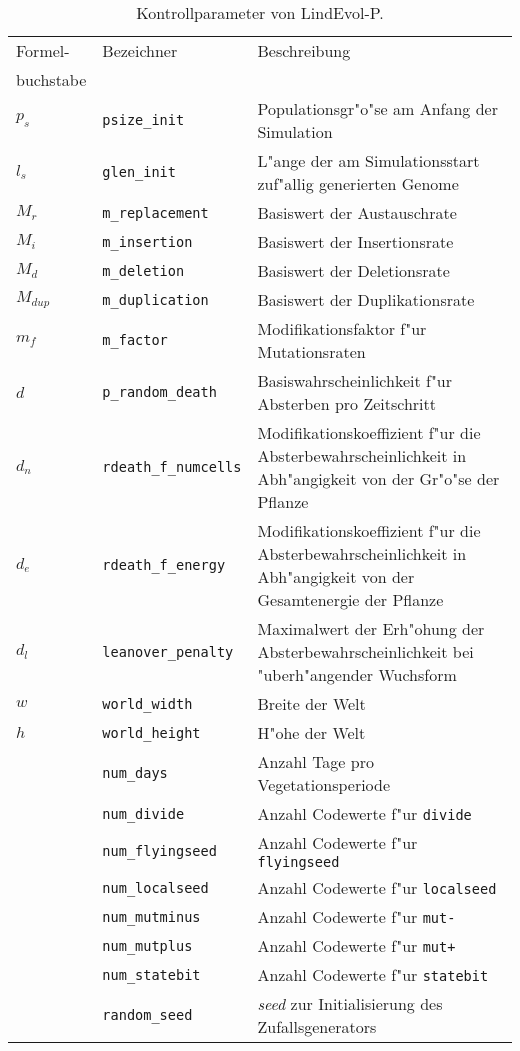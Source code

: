 \begin{table}[tb]

\noindent\begin{tabularx}{\linewidth}{|l|l|X|} \hline
Formel- & Bezeichner              & Beschreibung \\
buchstabe &                       & \\ \hline
$p_s$ & \verb|psize_init|         & Populationsgr"o"se am Anfang der Simulation \\
$l_s$ & \verb|glen_init|          & L"ange der am Simulationsstart zuf"allig generierten Genome \\
$M_r$ & \verb|m_replacement|      & Basiswert der Austauschrate \\
$M_i$ & \verb|m_insertion|        & Basiswert der Insertionsrate \\
$M_d$ & \verb|m_deletion|         & Basiswert der Deletionsrate \\
$M_{\mathit{dup}}$ & \verb|m_duplication| & Basiswert der Duplikationsrate \\
$m_f$ & \verb|m_factor|           & Modifikationsfaktor f"ur Mutationsraten \\
$d$   & \verb|p_random_death|     & Basiswahrscheinlichkeit f"ur Absterben pro Zeitschritt \\
$d_n$ & \verb|rdeath_f_numcells|  & Modifikationskoeffizient f"ur die Absterbewahrscheinlichkeit
                                    in Abh"angigkeit von der Gr"o"se der Pflanze \\
$d_e$ & \verb|rdeath_f_energy|    & Modifikationskoeffizient f"ur die Absterbewahrscheinlichkeit
                                    in Abh"angigkeit von der Gesamtenergie der Pflanze \\
$d_l$ & \verb|leanover_penalty|   & Maximalwert der Erh"ohung der Absterbewahrscheinlichkeit
                                    bei "uberh"angender Wuchsform \\
$w$   & \verb|world_width|        & Breite der Welt \\
$h$   & \verb|world_height|       & H"ohe der Welt \\
      & \verb|num_days|           & Anzahl Tage pro Vegetationsperiode \\
      & \verb|num_divide|         & Anzahl Codewerte f"ur \verb|divide| \\
      & \verb|num_flyingseed|     & Anzahl Codewerte f"ur \verb|flyingseed| \\
      & \verb|num_localseed|      & Anzahl Codewerte f"ur \verb|localseed| \\
      & \verb|num_mutminus|       & Anzahl Codewerte f"ur \verb|mut-| \\
      & \verb|num_mutplus|        & Anzahl Codewerte f"ur \verb|mut+| \\
      & \verb|num_statebit|       & Anzahl Codewerte f"ur \verb|statebit| \\
      & \verb|random_seed|        & {\slshape seed} zur Initialisierung des Zufallsgenerators \\ \hline
\end{tabularx}

\caption{\label{lnd5-controlparams}
Kontrollparameter von LindEvol-P.
}
\end{table}

